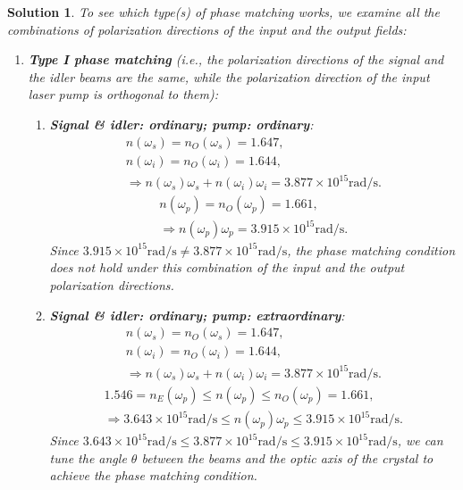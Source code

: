 \documentclass[UTF8,10pt,a4paper]{article}
\theoremstyle{Problem}
\theoremstyle{Solution}
\newtheorem*{sol}{Solution}
\begin{document}
\begin{sol}
    To see which type(s) of phase matching works, we examine all the combinations of polarization directions of the input and the output fields:
    \begin{enumerate}
        \item \textbf{Type I phase matching} (i.e., the polarization directions of the signal and the idler beams are the same, while the polarization direction of the input laser pump is orthogonal to them):
        \begin{enumerate}
            \item \textbf{Signal \& idler: ordinary; pump: ordinary}:
            \begin{gather}
                n(\omega_s)=n_O(\omega_s)=1.647,\\
                n(\omega_i)=n_O(\omega_i)=1.644,\\
                \Longrightarrow n(\omega_s)\omega_s+n(\omega_i)\omega_i=3.877\times 10^{15}\text{rad}/\text{s}.
            \end{gather}
            \begin{gather}
                n(\omega_p)=n_O(\omega_p)=1.661,\\
                \Longrightarrow n(\omega_p)\omega_p=3.915\times 10^{15}\text{rad}/\text{s}.
            \end{gather}
            Since $3.915\times 10^{15}\text{rad}/\text{s}\neq 3.877\times 10^{15}\text{rad}/\text{s}$, the phase matching condition does not hold under this combination of the input and the output polarization directions.
            \item \textbf{Signal \& idler: ordinary; pump: extraordinary}:
            \begin{gather}
                n(\omega_s)=n_O(\omega_s)=1.647,\\
                n(\omega_i)=n_O(\omega_i)=1.644,\\
                \Longrightarrow n(\omega_s)\omega_s+n(\omega_i)\omega_i=3.877\times 10^{15}\text{rad}/\text{s}.
            \end{gather}
            \begin{gather}
                1.546=n_E(\omega_p)\leq n(\omega_p)\leq n_O(\omega_p)=1.661,\\
                \Longrightarrow 3.643\times 10^{15}\text{rad}/\text{s}\leq n(\omega_p)\omega_p\leq 3.915\times 10^{15}\text{rad}/\text{s}.
            \end{gather}
            Since $3.643\times 10^{15}\text{rad}/\text{s}\leq 3.877\times 10^{15}\text{rad}/\text{s}\leq 3.915\times 10^{15}\text{rad}/\text{s}$, we can tune the angle $\theta$ between the beams and the optic axis of the crystal to achieve the phase matching condition.\\

\end{enumerate}
\end{enumerate}
\end{sol}
\end{document}
